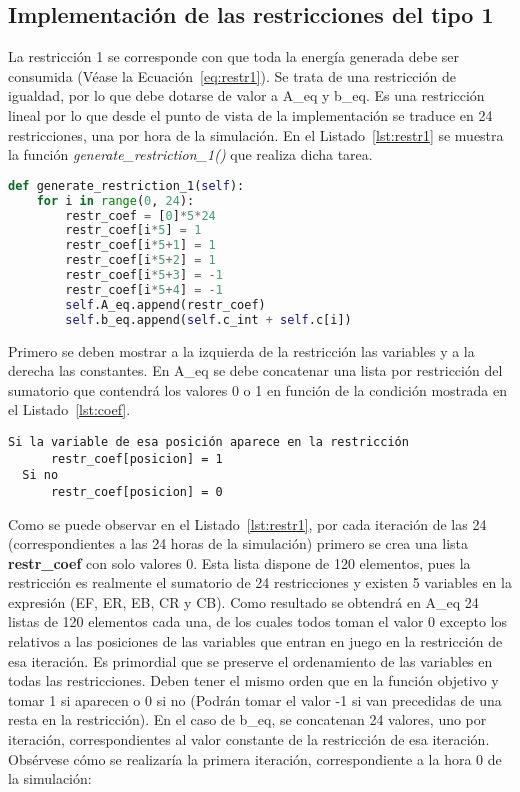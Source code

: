 \subsection{Implementación de las restricciones del tipo 1}
La restricción 1 se corresponde con que toda la energía generada debe ser consumida (Véase la Ecuación~\ref{eq:restr1}). Se trata de una restricción de igualdad, por lo que debe dotarse de valor a A\_eq y b\_eq. Es una restricción lineal por lo que desde el punto de vista de la implementación se traduce en 24 restricciones, una por hora de la simulación. En el Listado~\ref{lst:restr1} se muestra la función \textit{generate\_restriction\_1()} que realiza dicha tarea.\\
\begin{lstlisting}[language=Python,float=ht,caption={Restricciones del tipo 1},label={lst:restr1}]
def generate_restriction_1(self):
    for i in range(0, 24):
        restr_coef = [0]*5*24
        restr_coef[i*5] = 1
        restr_coef[i*5+1] = 1
        restr_coef[i*5+2] = 1
        restr_coef[i*5+3] = -1
        restr_coef[i*5+4] = -1
        self.A_eq.append(restr_coef)
        self.b_eq.append(self.c_int + self.c[i])
\end{lstlisting}

Primero se deben mostrar a la izquierda de la restricción las variables y a la derecha las constantes. En A\_eq se debe concatenar una lista por restricción del sumatorio que contendrá los valores 0 o 1 en función de la condición mostrada en el Listado~\ref{lst:coef}.\\

\begin{lstlisting}[numbers=none,float=ht,caption={Condición para dotar de valor los coeficientes},label={lst:coef}]
  Si la variable de esa posición aparece en la restricción
      restr_coef[posicion] = 1
  Si no
      restr_coef[posicion] = 0
\end{lstlisting}
Como se puede observar en el Listado~\ref{lst:restr1}, por cada iteración de las 24 (correspondientes a las 24 horas de la simulación) primero se crea una lista \textbf{restr\_coef} con solo valores 0. Esta lista dispone de 120 elementos, pues la restricción es realmente el sumatorio de 24 restricciones y existen 5 variables en la expresión (EF, ER, EB, CR y CB). Como resultado se obtendrá en A\_eq 24 listas de 120 elementos cada una, de los cuales todos toman el valor 0 excepto los relativos a las posiciones de las variables que entran en juego en la restricción de esa iteración. Es primordial que se preserve el ordenamiento de las variables en todas las restricciones. Deben tener el mismo orden que en la función objetivo y tomar 1 si aparecen o 0 si no (Podrán tomar el valor -1 si van precedidas de una resta en la restricción). En el caso de b\_eq, se concatenan 24 valores, uno por iteración, correspondientes al valor constante de la restricción de esa iteración. Obsérvese cómo se realizaría la primera iteración, correspondiente a la hora 0 de la simulación:\\

